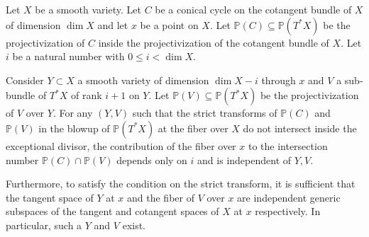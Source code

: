 \begin{lemma}
\notready\label{intersection-comparison} Let $X$ be a smooth variety. Let $C$ be a conical cycle on the cotangent bundle of $X$ of dimension $\dim X$ and let $x$ be a point on $X$.  Let $\mathbb P(C) \subseteq \mathbb P (T^* X)$ be the projectivization of $C$ inside the projectivization of the cotangent bundle of $X$. Let $i$ be a natural number with $0 \leq i < \dim X$.

Consider $Y \subset X$ a smooth variety of dimension $\dim X-i$ through $x$ and $V$ a sub-bundle of $T^* X$  of rank $i+1$ on $Y$.  Let $\mathbb P(V) \subseteq \mathbb P( T^* X)$ be the projectivization of $V$ over $Y$. For any $(Y,V)$ such that the strict transforms of $\mathbb P(C)$ and $\mathbb P(V)$ in the blowup of $\mathbb P(T^* X)$ at the fiber over $X$ do not intersect inside the exceptional divisor, the contribution of the fiber over $x$ to the intersection number $\mathbb P(C) \cap \mathbb P(V)$ depends only on $i$ and is independent of $Y,V$.

Furthermore, to satisfy the condition on the strict transform, it is sufficient that the tangent space of $Y$ at $x$ and the fiber of $V$ over $x$ are independent generic subspaces of the tangent and cotangent spaces of $X$ at $x$ respectively. In particular, such a $Y$ and $V$ exist.\end{lemma}


